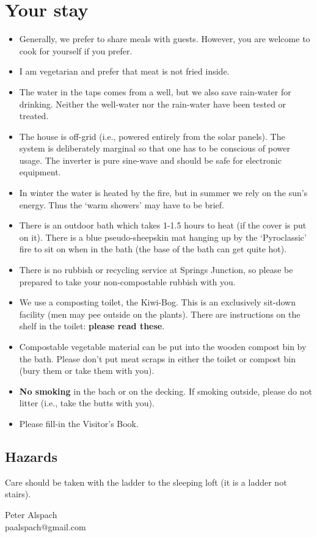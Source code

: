 \documentclass[12pt]{article} %
\begin{document}
\section{Your stay}
\begin{itemize}
  \item Generally, we prefer to share meals with guests.  However, you are welcome to cook for yourself if you prefer.
  \item I am vegetarian and prefer that meat is not fried inside.
  \item The water in the taps comes from a well, but we also save rain-water for drinking.  Neither the well-water nor the rain-water have been tested or treated.
  \item The house is off-grid (i.e., powered entirely from the solar panels).  The system is deliberately marginal so that one has to be conscious of power usage.  The inverter is pure sine-wave and should be safe for electronic equipment.
  \item In winter the water is heated by the fire, but in summer we rely on the sun's energy.  Thus the `warm showers' may have to be brief.
  \item There is an outdoor bath which takes 1-1.5 hours to heat (if the cover is put on it).  There is a blue pseudo-sheepskin mat hanging up by the `Pyroclassic' fire to sit on when in the bath (the base of the bath can get quite hot).
  \item There is no rubbish or recycling service at Springs Junction, so please be prepared to take your non-compostable rubbish with you.
  \item We use a composting toilet, the Kiwi-Bog.  This is an exclusively sit-down facility (men may pee outside on the plants).  There are instructions on the shelf in the toilet: \textbf{please read these}.
  \item Compostable vegetable material can be put into the wooden compost bin by the bath.  Please don't put meat scraps in either the toilet or compost bin (bury them or take them with you).
  \item \textbf{No smoking} in the bach or on the decking.  If smoking outside, please do not litter (i.e., take the butts with you).
  \item Please fill-in the Visitor's Book.
\end{itemize}

\subsection{Hazards}
Care should be taken with the ladder to the sleeping loft (it is a ladder not stairs).

\bigskip
Peter Alspach\\paalspach@gmail.com
\end{document}
